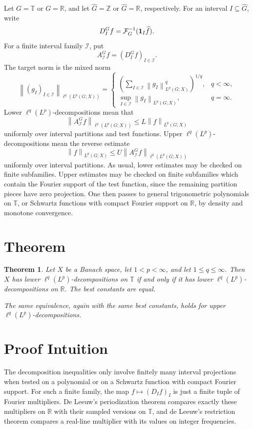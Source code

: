 \documentclass[11pt]{article}
\newtheorem{theorem}{Theorem}
\newcommand{\T}{\mathbb T}
\newcommand{\R}{\mathbb R}
\newcommand{\Z}{\mathbb Z}
\newcommand{\norm}[1]{\left\lVert #1 \right\rVert}
\begin{document}
Let \(G=\T\) or \(G=\R\), and let \(\widehat G=\Z\) or \(\widehat G=\R\),
respectively.  For an interval \(I\subseteq \widehat G\), write
\[
  D_I^G f = \mathcal F_G^{-1}({\bf 1}_I \widehat f).
\]
For a finite interval family \(\mathcal I\), put
\[
  A_{\mathcal I}^G f = (D_I^G f)_{I\in\mathcal I}.
\]
The target norm is the mixed norm
\[
  \norm{(g_I)_{I\in\mathcal I}}_{\ell^q(L^p(G;X))}
  =
  \begin{cases}
  \left(\sum_{I\in\mathcal I}\norm{g_I}_{L^p(G;X)}^q\right)^{1/q},
    & q<\infty,\\
  \sup_{I\in\mathcal I}\norm{g_I}_{L^p(G;X)},& q=\infty.
  \end{cases}
\]
Lower \(\ell^q(L^p)\)-decompositions mean that
\[
  \norm{A_{\mathcal I}^G f}_{\ell^q(L^p(G;X))}
  \le L\norm{f}_{L^p(G;X)}
\]
uniformly over interval partitions and test functions.  Upper
\(\ell^q(L^p)\)-decompositions mean the reverse estimate
\[
  \norm{f}_{L^p(G;X)}
  \le U\norm{A_{\mathcal I}^G f}_{\ell^q(L^p(G;X))}
\]
uniformly over interval partitions.  As usual, lower estimates may be checked
on finite subfamilies.  Upper estimates may be checked on finite subfamilies
which contain the Fourier support of the test function, since the remaining
partition pieces have zero projection.  One then passes to general
trigonometric polynomials on \(\T\), or Schwartz functions with compact
Fourier support on \(\R\), by density and monotone convergence.

\section*{Theorem}

\begin{theorem}
Let \(X\) be a Banach space, let \(1<p<\infty\), and let
\(1\le q\le\infty\).  Then \(X\) has lower \(\ell^q(L^p)\)-decompositions on
\(\T\) if and only if it has lower \(\ell^q(L^p)\)-decompositions on \(\R\).
The best constants are equal.

The same equivalence, again with the same best constants, holds for upper
\(\ell^q(L^p)\)-decompositions.
\end{theorem}

\section*{Proof Intuition}

The decomposition inequalities only involve finitely many interval projections
when tested on a polynomial or on a Schwartz function with compact Fourier
support.  For such a finite family, the map \(f\mapsto(D_I f)_I\) is just a
finite tuple of Fourier multipliers.  De Leeuw's periodization theorem
compares exactly these multipliers on \(\R\) with their sampled versions on
\(\T\), and de Leeuw's restriction theorem compares a real-line multiplier
with its values on integer frequencies.
\end{document}
